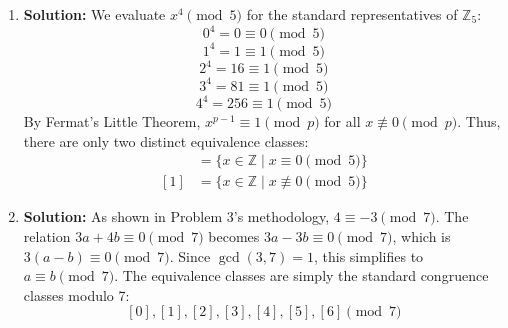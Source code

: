 \documentclass[11pt, a4paper]{article}
\theoremstyle{definition}
\theoremstyle{remark}
\newcommand{\Z}{\mathbb{Z}}
\begin{document}
\begin{enumerate}[label=\textbf{\arabic*.}]
    \begin{center}
    \end{center}

    \item \textbf{Solution:}
    We evaluate $x^4 \pmod{5}$ for the standard representatives of $\Z_5$:
    \[ 0^4 = 0 \equiv 0 \pmod{5} \]
    \[ 1^4 = 1 \equiv 1 \pmod{5} \]
    \[ 2^4 = 16 \equiv 1 \pmod{5} \]
    \[ 3^4 = 81 \equiv 1 \pmod{5} \]
    \[ 4^4 = 256 \equiv 1 \pmod{5} \]
    By Fermat's Little Theorem, $x^{p-1} \equiv 1 \pmod{p}$ for all $x \not\equiv 0 \pmod{p}$. Thus, there are only two distinct equivalence classes:
    \begin{align*}
        [0] &= \{x \in \Z \mid x \equiv 0 \pmod{5}\} \\
        [1] &= \{x \in \Z \mid x \not\equiv 0 \pmod{5}\}
    \end{align*}

    \item \textbf{Solution:}
    As shown in Problem 3's methodology, $4 \equiv -3 \pmod{7}$. The relation $3a + 4b \equiv 0 \pmod{7}$ becomes $3a - 3b \equiv 0 \pmod{7}$, which is $3(a - b) \equiv 0 \pmod{7}$. Since $\gcd(3, 7) = 1$, this simplifies to $a \equiv b \pmod{7}$. The equivalence classes are simply the standard congruence classes modulo 7:
    \[ [0], [1], [2], [3], [4], [5], [6] \pmod{7} \]


\end{enumerate}
\end{document}
